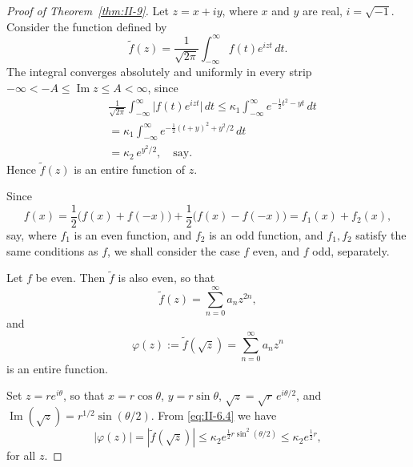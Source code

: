 \begin{proof}[Proof of Theorem~\ref{thm:II-9}]
Let $z=x+iy$, where $x$ and $y$ are real, $i=\sqrt{-1}$. Consider the function defined by
\begin{equation}\tag{6.3}\label{eq:II-6.3}
\tilde f(z)=\frac{1}{\sqrt{2\pi}}\int_{-\infty}^{\infty}f(t)e^{izt}\,dt.
\end{equation}
The integral converges absolutely and uniformly in every strip $-\infty<-A\le\operatorname{Im}z\le A<\infty$, since
\[
\begin{aligned}
&\frac{1}{\sqrt{2\pi}}\int_{-\infty}^{\infty}\bigl|f(t)e^{izt}\bigr|\,dt \le \kappa_{1}\int_{-\infty}^{\infty}e^{-\frac{1}{2}t^{2}-yt}\,dt\\
&= \kappa_{1}\int_{-\infty}^{\infty}e^{-\frac{1}{2}(t+y)^{2}+y^{2}/2}\,dt\\
&= \kappa_{2}\,e^{y^{2}/2},\quad\text{say}.
\end{aligned}
\]
Hence $\tilde f(z)$ is an entire function of $z$.

Since
\[
f(x)=\frac{1}{2}\bigl(f(x)+f(-x)\bigr)+\frac{1}{2}\bigl(f(x)-f(-x)\bigr)
=f_{1}(x)+f_{2}(x),
\]
say, where $f_{1}$ is an even function, and $f_{2}$ is an odd function, and $f_{1},f_{2}$ satisfy the same conditions as $f$, we shall consider the case $f$ even, and $f$ odd, separately.

Let $f$ be even. Then $\tilde f$ is also even, so that
\[
\tilde f(z)=\sum_{n=0}^{\infty}a_{n}z^{2n},
\]
and
\begin{equation}\tag{6.4}\label{eq:II-6.4}
\varphi(z):=\tilde f(\sqrt{z})=\sum_{n=0}^{\infty}a_{n}z^{n}
\end{equation}
is an entire function.

Set $z=r e^{i\theta}$, so that $x=r\cos\theta$, $y=r\sin\theta$, $\sqrt{z}=\sqrt{r}\,e^{i\theta/2}$, and $\operatorname{Im}(\sqrt{z})=r^{1/2}\sin(\theta/2)$. From \eqref{eq:II-6.4} we have
\begin{equation}\tag{6.5}\label{eq:II-6.5}
|\varphi(z)|=|\tilde f(\sqrt{z})|\le\kappa_{2}e^{\frac{1}{2}r\sin^{2}(\theta/2)}
\le\kappa_{2}e^{\frac{1}{2}r},
\end{equation}
for all $z$.


\end{proof}
